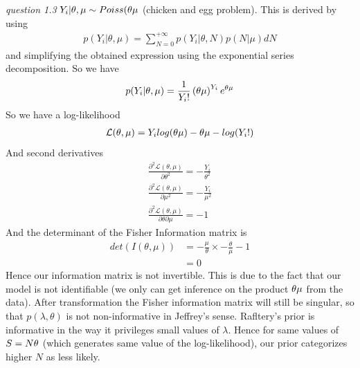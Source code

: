 \documentclass[twoside]{article}
\begin{document}
\vspace{.2 in}
\textit{question 1.3} $Y_i | \theta, \mu \sim Poiss(\theta \* \mu$ (chicken and egg problem). This is derived by using
\begin{align*}
p(Y_i | \theta, \mu) = \sum_{N=0}^{+\infty} p(Y_i| \theta, N) p(N | \mu) dN
\end{align*}
and simplifying the obtained expression using the exponential series decomposition. So we have
\begin{align*}
p(Y_i | \theta, \mu) = \frac{1}{Y_i !} \left(\theta \* \mu \right)^{Y_i} \* e^{\theta \*\mu} 
\end{align*}
So we have a log-likelihood
\begin{align*}
\mathcal{L}(\theta, \mu) = Y_i \* log(\theta \* \mu) - \theta \* \mu -log(Y_i!)
\end{align*}
And second derivatives
\begin{align*}
\frac{\partial^2 \mathcal{L}(\theta, \mu)}{\partial \theta^2} = - \frac{Y_i}{\theta^2}\\
\frac{\partial^2 \mathcal{L}(\theta, \mu)}{\partial \mu^2} = - \frac{Y_i}{\mu^2}\\
\frac{\partial^2 \mathcal{L}(\theta, \mu)}{\partial \theta \partial \mu} = - 1
\end{align*}
And the determinant of the Fisher Information matrix is 
\begin{align*}
det(I(\theta, \mu)) & = -\frac{\mu}{\theta} \times - \frac{\theta}{\mu} - 1\\
& = 0
\end{align*}
Hence our information matrix is not invertible. This is due to the fact that our model is not identifiable (we only can get inference on the product $\theta \* \mu$ from the data). After transformation the Fisher information matrix will still be singular, so that $p(\lambda, \theta)$ is not non-informative in Jeffrey's sense. Rafltery's prior is informative in the way it privileges small values of $\lambda$. Hence for same values of $S = N \* \theta$ (which generates same value of the log-likelihood), our prior categorizes higher $N$ as less likely.\\
\end{document}
